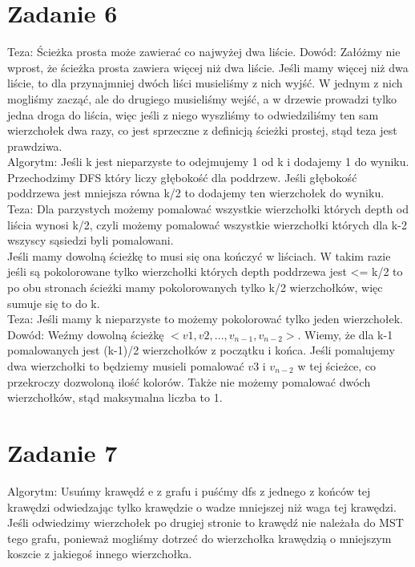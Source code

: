 \documentclass[12pt]{article}
\begin{document}
\section{Zadanie 6}
Teza: Ścieżka prosta może zawierać co najwyżej dwa liście.
Dowód: Załóżmy nie wprost, że ścieżka prosta zawiera więcej niż dwa liście. Jeśli mamy więcej niż dwa liście, to dla przynajmniej dwóch liści musieliśmy z nich wyjść. W jednym z nich mogliśmy zacząć, ale do drugiego musieliśmy wejść, a w drzewie prowadzi tylko jedna droga do liścia, więc jeśli z niego wyszliśmy to odwiedziliśmy ten sam wierzchołek dwa razy, co jest sprzeczne z definicją ścieżki prostej, stąd teza jest prawdziwa.\\

Algorytm: 
Jeśli k jest nieparzyste to odejmujemy 1 od k i dodajemy 1 do wyniku.
Przechodzimy DFS który liczy głębokość dla poddrzew. Jeśli głębokość poddrzewa jest mniejsza równa k/2 to dodajemy ten wierzchołek do wyniku.\\

Teza: Dla parzystych możemy pomalować wszystkie wierzchołki których depth od liścia wynosi k/2, czyli możemy pomalować wszystkie wierzchołki których dla k-2 wszyscy sąsiedzi byli pomalowani.\\

Jeśli mamy dowolną ścieżkę to musi się ona kończyć w liściach. W takim razie jeśli są pokolorowane tylko wierzchołki których depth poddrzewa jest <= k/2 to po obu stronach ścieżki mamy pokolorowanych tylko k/2 wierzchołków, więc sumuje się to do k.\\

Teza: Jeśli mamy k nieparzyste to możemy pokolorować tylko jeden wierzchołek.\\

Dowód: Weźmy dowolną ścieżkę $<v1, v2, ..., v_{n-1}, v_{n-2}>$. Wiemy, że dla k-1 pomalowanych jest (k-1)/2 wierzchołków z początku i końca. Jeśli pomalujemy dwa wierzchołki to będziemy musieli pomalować $v3$ i $v_{n-2}$ w tej ścieżce, co przekroczy dozwoloną ilość kolorów. Także nie możemy pomalować dwóch wierzchołków, stąd maksymalna liczba to 1.

\section{Zadanie 7}
Algorytm:
Usuńmy krawędź e z grafu i puśćmy dfs z jednego z końców tej krawędzi odwiedzając tylko krawędzie o wadze mniejszej niż waga tej krawędzi. Jeśli odwiedzimy wierzchołek po drugiej stronie to krawędź nie należała do MST tego grafu, ponieważ mogliśmy dotrzeć do wierzchołka krawędzią o mniejszym koszcie z jakiegoś innego wierzchołka.\\
\end{document}
